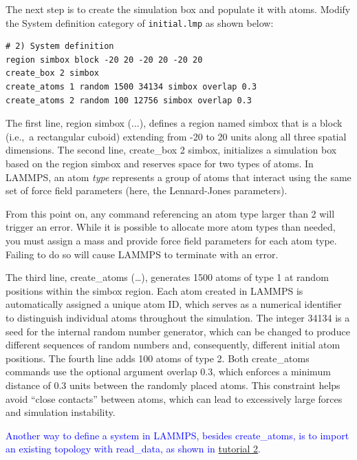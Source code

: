 \documentclass[9pt,tutorial]{livecoms}
\newcommand{\lmpcmd}[1]{\hspace{0pt}\colorbox{listing}{\textcolor{command}{\small{#1}}}\hspace{0pt}} %
\newcommand{\flecmd}[1]{\textcolor{command}{\texttt{#1}}} %
\begin{document}
The next step is to create the simulation box and populate it with
atoms.  Modify the \lmpcmd{System definition} category of
\flecmd{initial.lmp} as shown below:
\begin{lstlisting}
# 2) System definition
region simbox block -20 20 -20 20 -20 20
create_box 2 simbox
create_atoms 1 random 1500 34134 simbox overlap 0.3
create_atoms 2 random 100 12756 simbox overlap 0.3
\end{lstlisting}
The first line, \lmpcmd{region simbox (...)}, defines a region named
\lmpcmd{simbox} that is a block (i.e.,~a rectangular cuboid) extending
from -20 to 20 units along all three spatial dimensions.  The second
line, \lmpcmd{create\_box 2 simbox}, initializes a simulation box based
on the region \lmpcmd{simbox} and reserves space for two types of atoms.
{\color{blue}In LAMMPS, an atom \emph{type} represents a group of atoms that
interact using the same set of force field parameters (here, the Lennard-Jones
parameters).}

\begin{note}
  From this point on, any command referencing an atom type larger than 2
  will trigger an error.  While it is possible to allocate more atom
  types than needed, you must assign a mass and provide force field
  parameters for each atom type.  Failing to do so will cause LAMMPS to
  terminate with an error.
\end{note}

The third line, \lmpcmd{create\_atoms (\dots)}, generates 1500 atoms of
type 1 at random positions within the \lmpcmd{simbox} region.  
{\color{blue}Each atom created in LAMMPS is automatically assigned a unique
atom ID, which serves as a numerical identifier to distinguish individual atoms
throughout the simulation.} The
integer 34134 is a seed for the internal random number generator, which
can be changed to produce different sequences of random numbers and,
consequently, different initial atom positions.  The fourth line adds
100 atoms of type 2.  Both \lmpcmd{create\_atoms} commands use the
optional argument \lmpcmd{overlap 0.3}, which enforces a minimum
distance of 0.3 units between the randomly placed atoms.  This
constraint helps avoid ``close contacts'' between atoms, which can lead
to excessively large forces and simulation instability.

\begin{note}
\textcolor{blue}{Another way to define a system in LAMMPS, besides \lmpcmd{create\_atoms}, is to
import an existing topology with \lmpcmd{read\_data}, as shown
in \hyperref[carbon-nanotube-label]{tutorial 2}.}
\end{note}
\end{document}

